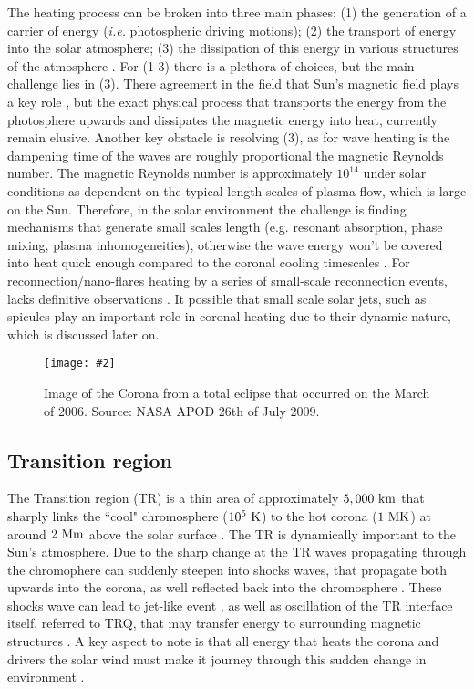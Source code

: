 \documentclass[12pt]{ociamthesis}
\newcommand{\mfig}[4]{
  \begin{figure}
  \begin{center}
  \texttt{[image: \#2]}
  \caption{#3}
  \label{#4}
  \end{center}
  \end{figure}}
\begin{document}
%
The heating process can be broken into three main phases: (1) the generation of a carrier of energy (\textit{i.e.} photospheric driving motions); (2) the transport of energy into the solar atmosphere; (3) the dissipation of this energy in various structures of the atmosphere \citep{Wentzel1974SoPh39129W, Robert2004AG45d34E}. For (1-3) there is a plethora of choices, but the main challenge lies in (3). There agreement in the field that Sun's magnetic field plays a key role \citep{Parnell2012RSPTA3703217P, Arregui2015RSPTA37340261A}, but the exact physical process that transports the energy from the photosphere upwards and dissipates the magnetic energy into heat, currently remain elusive. Another key obstacle is resolving (3), as for wave heating is the dampening time of the waves are roughly proportional the magnetic Reynolds number. The magnetic Reynolds number is approximately  $10^{14}$ under solar conditions as dependent on the typical length scales of plasma flow, which is large on the Sun. Therefore, in the solar environment the challenge is finding mechanisms that generate small scales length (e.g. resonant absorption, phase mixing, plasma inhomogeneities), otherwise the wave energy won't be covered into heat quick enough compared to the coronal cooling timescales \citep{Doorsselaere2020SSRv216140V}. For reconnection/nano-flares heating by a series of small-scale reconnection events, lacks definitive observations \citep{Parnell2012RSPTA3703217P}. It possible that small scale solar jets, such as spicules play an important role in coronal heating due to their dynamic nature, which is discussed later on.
\mfig{0.65}{figures/corona_vangorp.png}{Image of the Corona from a total eclipse that occurred on the March of 2006. Source: NASA APOD 26th of July 2009.}{corona_image}
\subsection{Transition region}
\label{ssec:TR}
The Transition region (TR) is a thin area of approximately $5,000~\rm{km}$ \citep{Athay1981NASSP45085A} that sharply links the ``cool" chromosphere ($10^{5}~\rm{K}$) to the hot corona ($1~\rm{MK}$) at around $2~\rm{Mm}$ above the solar surface \citep{Lang_2006ses}. The TR is dynamically important to the Sun's atmosphere. Due to the sharp change at the TR waves propagating through the chromophere can suddenly steepen into shocks waves, that propagate both upwards into the corona, as well reflected back into the chromosphere \citep{Pontieu2005ApJ624L61D, Hansteen2007ASPC369193H, Yuan_2016ApJS, Zhenyong2018ApJ85565H}. These shocks wave can lead to jet-like event \citep{Heggland2007ApJ6661277H, kuz2017ApJ, Pontieu2005ApJ624L61D, De_Pontieu2007ApJ}, as well as oscillation of the TR interface itself, referred to TRQ, that may transfer energy to surrounding magnetic structures \citep{Scullion2011}. A key aspect to note is that all energy that heats the corona and drivers the solar wind must make it journey through this sudden change in environment \citep{Mariska1992strbookM}.     
\end{document}
